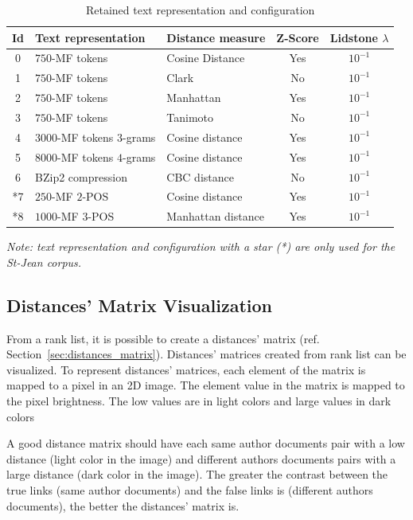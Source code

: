 \begin{table}
  \centering
  \caption{Retained text representation and configuration}
  \label{tab:9rl}
  \begin{tabular}{c l l c c}
    \toprule
    Id &
    Text representation &
    Distance measure &
    Z-Score &
    Lidstone $\lambda$\\
    \midrule
    0 & $750$-MF tokens & Cosine Distance & Yes & $10^{-1}$\\
    1 & $750$-MF tokens & Clark & No & $10^{-1}$\\
    2 & $750$-MF tokens & Manhattan & Yes & $10^{-1}$\\
    3 & $750$-MF tokens & Tanimoto & No & $10^{-1}$\\
    4 & $3000$-MF tokens $3$-grams & Cosine distance & Yes & $10^{-1}$\\
    5 & $8000$-MF tokens $4$-grams & Cosine distance & Yes & $10^{-1}$\\
    6 & BZip2 compression & CBC distance & No & $10^{-1}$\\
    *7 & $250$-MF $2$-POS & Cosine distance & Yes & $10^{-1}$\\
    *8 & $1000$-MF $3$-POS & Manhattan distance & Yes & $10^{-1}$\\
    \bottomrule
  \end{tabular}

  \vspace{0.2cm}

  \textit{Note: text representation and configuration with a star (*) are only used for the St-Jean corpus.}\\
\end{table}

\subsection{Distances' Matrix Visualization}

From a rank list, it is possible to create a distances' matrix (ref. Section~\ref{sec:distances_matrix}).
Distances' matrices created from rank list can be visualized.
To represent distances' matrices, each element of the matrix is mapped to a pixel in an 2D image.
The element value in the matrix is mapped to the pixel brightness.
The low values are in light colors and large values in dark colors

A good distance matrix should have each same author documents pair with a low distance (light color in the image) and different authors documents pairs with a large distance (dark color in the image).
The greater the contrast between the true links (same author documents) and the false links is (different authors documents), the better the distances' matrix is.

